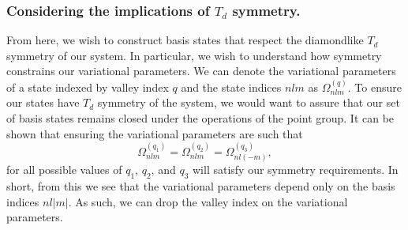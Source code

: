 %
%
%
%

\subsubsection{Considering the implications of $T_d$ symmetry.}

From here, we wish to construct basis states that respect the
diamondlike $T_{d}$ symmetry of our system. In particular, we wish to
understand how symmetry constrains our variational parameters. We can
denote the variational parameters of a state indexed by valley index
$q$ and the state indices $nlm$ as $\Omega^{(q)}_{nlm}$. To ensure our
states have $T_{d}$ symmetry of the system, we would want to assure
that our set of basis states remains closed under the operations of
the point group. It can be shown that ensuring the variational
parameters are such that
\begin{equation}
  \Omega^{(q_1)}_{nlm} = \Omega^{(q_2)}_{nlm} = \Omega^{(q_3)}_{nl(-m)},
\end{equation}
for all possible values of $q_1$, $q_2$, and $q_3$ will satisfy our
symmetry requirements. In short, from this we see that the variational
parameters depend only on the basis indices $nl|m|$.  As such, we can
drop the valley index on the variational parameters.


